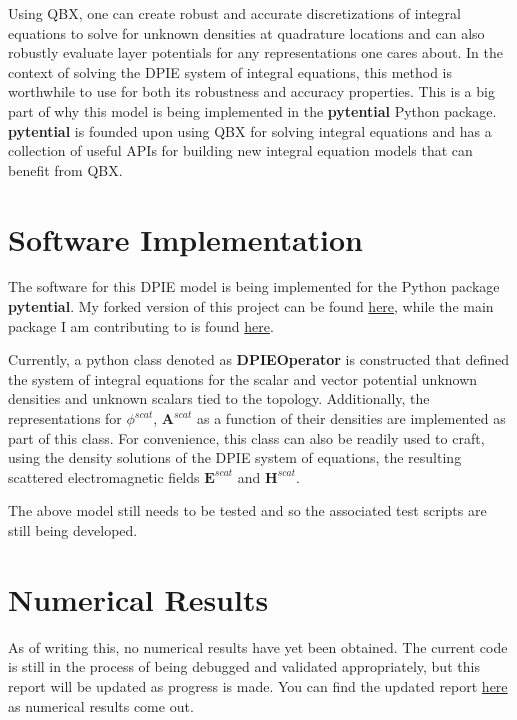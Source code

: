 \documentclass{article}[12pt]
\newcommand{\bvec}[1]{\boldsymbol{#1}}
\begin{document}
	Using QBX, one can create robust and accurate discretizations of integral equations to solve for unknown densities at quadrature locations and can also robustly evaluate layer potentials for any representations one cares about. In the context of solving the DPIE system of integral equations, this method is worthwhile to use for both its robustness and accuracy properties. This is a big part of why this model is being implemented in the \textbf{pytential} Python package. \textbf{pytential} is founded upon using QBX for solving integral equations and has a collection of useful APIs for building new integral equation models that can benefit from QBX.
	
	\section{Software Implementation}
	The software for this DPIE model is being implemented for the Python package \textbf{pytential}. My forked version of this project can be found \href{https://github.com/choward1491/pytential}{here}, while the main package I am contributing to is found \href{https://github.com/inducer/pytential}{here}.
	
	Currently, a python class denoted as \textbf{DPIEOperator} is constructed that defined the system of integral equations for the scalar and vector potential unknown densities and unknown scalars tied to the topology. Additionally, the representations for $\phi^{scat}$, $\bvec{A}^{scat}$ as a function of their densities are implemented as part of this class. For convenience, this class can also be readily used to craft, using the density solutions of the DPIE system of equations, the resulting scattered electromagnetic fields $\bvec{E}^{scat}$ and $\bvec{H}^{scat}$.
	
	The above model still needs to be tested and so the associated test scripts are still being developed.
	
	\section{Numerical Results}
	As of writing this, no numerical results have yet been obtained. The current code is still in the process of being debugged and validated appropriately, but this report will be updated as progress is made. You can find the updated report \href{https://github.com/choward1491/cs598APK_fast_algorithms/blob/master/project/report/dpie_qbx_report.pdf}{here} as numerical results come out.
	
\end{document}
